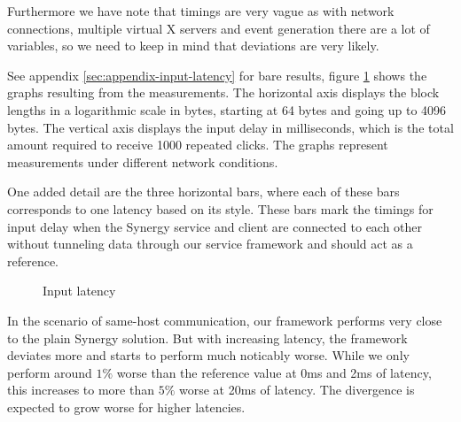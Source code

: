 Furthermore we have note that timings are very vague as with network connections, multiple virtual X servers and event generation there are a lot of variables, so we need to keep in mind that deviations are very likely.

See appendix \ref{sec:appendix-input-latency} for bare results, figure \ref{fig:input-latency} shows the graphs resulting from the measurements.
The horizontal axis displays the block lengths in a logarithmic scale in bytes, starting at 64 bytes and going up to 4096 bytes.
The vertical axis displays the input delay in milliseconds, which is the total amount required to receive 1000 repeated clicks.
The graphs represent measurements under different network conditions.

One added detail are the three horizontal bars, where each of these bars corresponds to one latency based on its style.
These bars mark the timings for input delay when the Synergy service and client are connected to each other without tunneling data through our service framework and should act as a reference.

\begin{figure}[t]
    \centering
    \caption{Input latency}
    \label{fig:input-latency}
\end{figure}


In the scenario of same-host communication, our framework performs very close to the plain Synergy solution.
But with increasing latency, the framework deviates more and starts to perform much noticably worse.
While we only perform around $1\%$ worse than the reference value at 0ms and 2ms of latency, this increases to more than $5\%$ worse at 20ms of latency.
The divergence is expected to grow worse for higher latencies.

